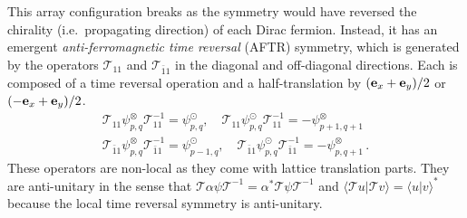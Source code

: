 This array configuration breaks \TR as the symmetry would have reversed the chirality (i.e.~propagating direction) of each Dirac fermion. Instead, it has an emergent {\em anti-ferromagnetic time reversal} (AFTR) symmetry, which is generated by the operators $\mathcal{T}_{11}$ and $\mathcal{T}_{\bar{1}1}$ in the diagonal and off-diagonal directions. Each is composed of a time reversal operation and a half-translation by $({\bf e}_x+{\bf e}_y)/2$ or $(-{\bf e}_x+{\bf e}_y)/2$. \begin{gather}\mathcal{T}_{11}\psi_{p,q}^\otimes\mathcal{T}_{11}^{-1}=\psi_{p,q}^\odot,\quad\mathcal{T}_{11}\psi_{p,q}^\odot\mathcal{T}_{11}^{-1}=-\psi_{p+1,q+1}^\otimes\nonumber\\\mathcal{T}_{\bar{1}1}\psi_{p,q}^\otimes\mathcal{T}_{\bar{1}1}^{-1}=\psi_{p-1,q}^\odot,\quad\mathcal{T}_{\bar{1}1}\psi_{p,q}^\odot\mathcal{T}_{\bar{1}1}^{-1}=-\psi_{p,q+1}^\otimes \,. \label{AFTR}\end{gather} These \AFTR operators are non-local as they come with lattice translation parts. They are anti-unitary in the sense that $\mathcal{T}\alpha\psi\mathcal{T}^{-1}=\alpha^\ast\mathcal{T}\psi\mathcal{T}^{-1}$ and $\langle\mathcal{T}u|\mathcal{T}v\rangle=\langle u|v\rangle^\ast$ because the local time reversal symmetry is anti-unitary. %
